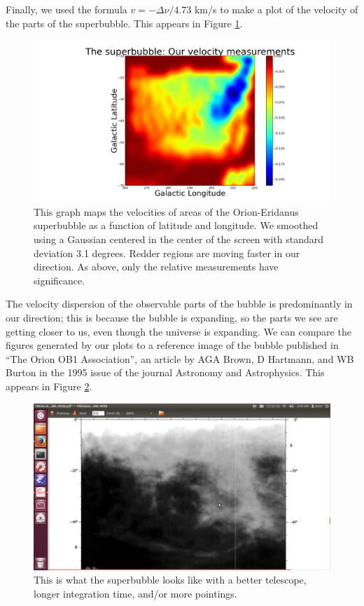 \documentclass[11pt]{article}
\begin{document}
Finally, we used the formula $v = -\Delta\nu / 4.73$ km/s to make a plot of the velocity of the parts of the superbubble. This appears in Figure \ref{velocity}. 

\begin{figure}
\centering
\includegraphics[scale=0.35]{garphs/velocity}
\caption{This graph maps the velocities of areas of the Orion-Eridanus superbubble as a function of latitude and longitude. We smoothed using a Gaussian centered in the center of the screen with standard deviation 3.1 degrees. Redder regions are moving faster in our direction. As above, only the relative measurements have significance.\label{velocity}}
\end{figure} 

The velocity dispersion of the observable parts of the bubble is predominantly in our direction; this is because the bubble is expanding, so the parts we see are getting closer to us, even though the universe is expanding. We can compare the figures generated by our plots to a reference image of the bubble published in ``The Orion OB1 Association'', an article by AGA Brown, D Hartmann, and WB Burton in the 1995 issue of the journal Astronomy and Astrophysics. This appears in Figure \ref{canon}.

\begin{figure}
\centering
\includegraphics[scale=0.35]{garphs/superbubble}
\caption{This is what the superbubble looks like with a better telescope, longer integration time, and/or more pointings.  \label{canon}}
\end{figure} 
\end{document}

